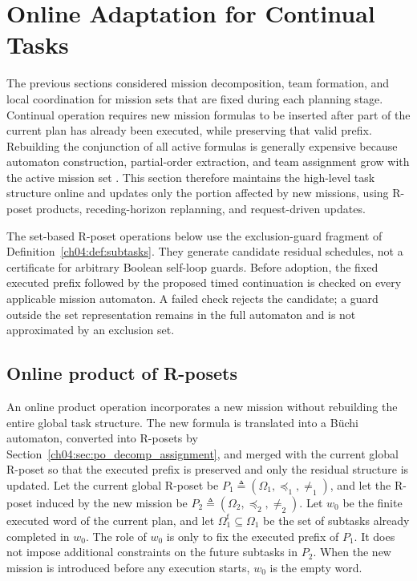\section{Online Adaptation for Continual Tasks}
\label{ch04:sec:online_continual_tasks}

The previous sections considered mission decomposition, team formation, and
local coordination for mission sets that are fixed during each planning stage.
Continual operation requires new mission formulas to be inserted after part of
the current plan has already been executed, while preserving that valid prefix.
Rebuilding the conjunction of all active formulas is generally expensive because
automaton construction, partial-order extraction, and team assignment grow with
the active mission set
\citep{schillinger2018simultaneous,kantaros2020stylus,luo2022temporal,
liu2024time,luo2025hulk}. This section therefore maintains the high-level task
structure online and updates only the portion affected by new missions, using
R-poset products, receding-horizon replanning, and request-driven updates.


\begin{revision}
The set-based R-poset operations below use the exclusion-guard fragment of
Definition~\ref{ch04:def:subtasks}. They generate candidate residual schedules,
not a certificate for arbitrary Boolean self-loop guards. Before adoption,
the fixed executed prefix followed by the proposed timed continuation is
checked on every applicable mission automaton. A failed check rejects the
candidate; a guard outside the set representation remains in the full
automaton and is not approximated by an exclusion set.
\end{revision}

\subsection{Online product of R-posets}
\label{ch04:subsec:online_poset_product}

An online product operation incorporates a new mission without rebuilding the
entire global task structure. The new formula is translated into a B\"uchi
automaton, converted into R-posets by
Section~\ref{ch04:sec:po_decomp_assignment}, and merged with the current global
R-poset so that the executed prefix is preserved and only the residual structure
is updated.
Let the current global R-poset be
$P_1 \triangleq (\Omega_1,\preceq_1,\neq_1)$, and let the R-poset induced by
the new mission be
$P_2 \triangleq (\Omega_2,\preceq_2,\neq_2)$. Let $w_0$ be the finite executed
word of the current plan, and let
$\Omega_1^{\mathrm{f}} \subseteq \Omega_1$ be the set of subtasks already
completed in $w_0$. The role of $w_0$ is only to fix the executed prefix of
$P_1$. It does not impose additional constraints on the future subtasks in
$P_2$. When the new mission is introduced before any execution starts, $w_0$ is
the empty word.

